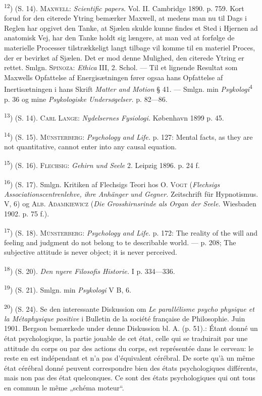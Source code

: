 \documentclass[12pt,a4paper,openany]{book}
\newcommand{\opage}[1]{\marginnote{\footnotesize\textit{[#1]}}}
\begin{document}
\begin{small}
\textsuperscript{12}) (S. 14). \textsc{Maxwell}: \textit{Scientific papers.}
Vol. II. Cambridge 1890. p. 759. Kort forud for den citerede Ytring bemærker
Maxwell, at medens man nu til Dags i Reglen har opgivet den Tanke, at Sjælen
skulde kunne findes et Sted i Hjernen ad anatomisk Vej, har den Tanke holdt sig
længere, at man ved at forfølge de materielle Processer tilstrækkeligt langt
tilbage vil komme til en materiel Proces, der er bevirket af Sjælen. Det er mod
denne Mulighed, den citerede Ytring er rettet. Smlgn. \textsc{Spinoza}:
\textit{Ethica} III, 2. Schol. --- Til et lignende Resultat som Maxwells
Opfattelse af Energisætningen fører ogsaa hans Opfattelse af Inertisætningen i
hans Skrift \textit{Matter and Motion} § 41. --- Smlgn. min
\textit{Psykologi}\textsuperscript{4} p. 36 og mine \textit{Psykologiske
Undersøgelser.} p. 82---86.

\textsuperscript{13}) (S. 14). \textsc{Carl Lange}: \textit{Nydelsernes
Fysiologi.} København 1899 p. 45.

\textsuperscript{14}) (S. 15). \textsc{Münsterberg}: \textit{Psychology and
Life.} p. 127: Mental facts, as they are not quantitative, cannot enter into
any causal equation.

\textsuperscript{15}) (S. 16). \textsc{Flechsig}: \textit{Gehirn und Seele} 2.
Leipzig 1896. p. 24 f.

\textsuperscript{16}) (S. 17). Smlgn. Kritiken af Flechsigs Teori hos
\textsc{O. Vogt} (\textit{Flechsigs Associationscentrenlehve, ihre Anhänger und
Gegner.} Zeitschrift für Hypnotismus. V, 6) og \textsc{Alb. Adamkiewicz}
(\textit{Die Grosshirnsrinde als Organ der Seele.} Wiesbaden 1902. p. 75 f.).

\textsuperscript{17}) (S. 18). \textsc{Münsterberg}: \textit{Psychology and
Life.} p. 172: The reality of the will and feeling and judgment do not belong
to te describable world. --- p. 208; The subjective attitude is never object;
it is never perceived.

\textsuperscript{18}) (S. 20). \textit{Den nyere Filosofis Historie.} I p. 334---336.

\textsuperscript{19}) (S. 21). Smlgn. min \textit{Psykologi} V B, 6.

\textsuperscript{20}) (S. 24). Se den interessante Diskussion om \textit{Le
parallélisme psycho%
\opage{87}physique et la Métaphysique positive} i Bulletin de la société
française de Philosophie. Juin 1901. Bergson bemærkede under denne Diskussion
bl. A. (p. 51).: Étant donné un état psychologique, la partie jouable de cet
état, celle qui se traduirait par une attitude du corps ou par des actions du
corps, est représentée dans le cerveau: le reste en est indépendant et n'a pas
d'équivalent cérébral. De sorte qu'à un même état cérébral donné peuvent
correspondre bien des états psychologiques différents, mais non pas des état
quelconques. Ce sont des états psychologiques qui ont tous en commun le même
„schéma moteur“.


\end{small}
\end{document}
